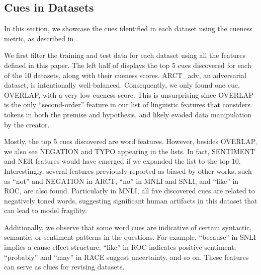 \subsection{Cues in Datasets} 

In this section, we showcase the cues identified in each dataset using 
the cueness metric, as described in . 

We first filter the training and test data for each dataset using all the features defined in this paper. The left half of  displays the top 5 cues discovered for each of the 10 datasets, along with their cueness scores. ARCT\_adv, an adversarial dataset, is intentionally well-balanced. Consequently, we only found one cue, OVERLAP, with a very low cueness score. This is unsurprising since OVERLAP is the only ``second-order'' feature in our list of linguistic features that considers tokens in both the premise and hypothesis, and likely evaded data manipulation by the creator.

Mostly, the top 5 cues discovered are word features. However, besides OVERLAP, we also see NEGATION and TYPO appearing in the lists. In fact, SENTIMENT and NER features would have emerged if we expanded the list to the top 10. Interestingly, several features previously reported as biased by other works, such as ``not'' and NEGATION in ARCT, ``no'' in MNLI and SNLI, and ``like'' in ROC, are also found. Particularly in MNLI, all five discovered cues are related to negatively toned words, suggesting significant human artifacts in this dataset that can lead to model fragility.

Additionally, we observe that some word cues are indicative of certain syntactic, semantic, or sentiment patterns in the questions. For example, ``because'' in SNLI implies a cause-effect structure; ``like'' in ROC indicates positive sentiment; ``probably'' and ``may'' in RACE suggest uncertainty, and so on. These features can serve as clues for revising datasets.

